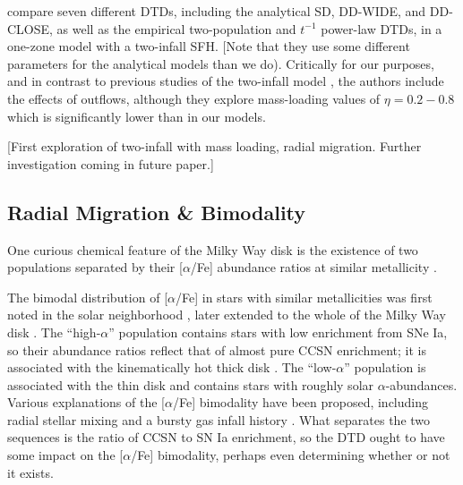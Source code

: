 \documentclass[twocolumn,twocolappendix,linenumbers,trackchanges]{aastex631}
\newcommand{\aFe}{[$\alpha$/Fe]\xspace}
\begin{document}
\citet{Palicio2023-AnalyticDTD} compare seven different DTDs, including the analytical SD, DD-WIDE, and DD-CLOSE, as well as the empirical two-population and $t^{-1}$ power-law DTDs, in a one-zone model with a two-infall SFH. [Note that they use some different parameters for the analytical models than we do). Critically for our purposes, and in contrast to previous studies of the two-infall model \citep[e.g.,][others]{Chiappini1997-TwoInfall,Spitoni2021-TwoInfall}, the authors include the effects of outflows, although they explore mass-loading values of $\eta=0.2-0.8$ which is significantly lower than in our models.

[First exploration of two-infall with mass loading, radial migration. Further investigation coming in future paper.]

\subsection{Radial Migration \& Bimodality}

One curious chemical feature of the Milky Way disk is the existence of two populations separated by their \aFe abundance ratios at similar metallicity \citep[e.g.,][]{Bensby2014-solarNeighborhoodAbundances}. 

The bimodal distribution of \aFe in stars with similar metallicities was first noted in the solar neighborhood \citep[e.g.,][]{Furhmann1998-NearbyStars}, later extended to the whole of the Milky Way disk \citep{Nidever2014-ChemicalEvolutionAPOGEE,Hayden2015-ChemicalCartography}. The ``high-$\alpha$'' population contains stars with low enrichment from SNe Ia, so their abundance ratios reflect that of almost pure CCSN enrichment; it is associated with the kinematically hot thick disk \citep{Bensby2003-AbundanceTrends}. The ``low-$\alpha$'' population is associated with the thin disk and contains stars with roughly solar $\alpha$-abundances.
Various explanations of the \aFe bimodality have been proposed, including radial stellar mixing \citep{Schonrich2009-RadialMixing} and a bursty gas infall history \citep[e.g.,][]{Spitoni2021-TwoInfall}.
What separates the two sequences is the ratio of CCSN to SN Ia enrichment, so the DTD ought to have some impact on the \aFe bimodality, perhaps even determining whether or not it exists.
\end{document}
